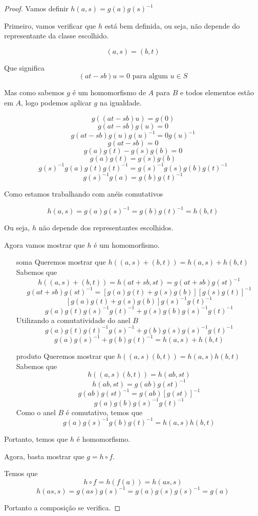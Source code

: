 \documentclass[10pt,a4paper]{article}
\begin{document}
\begin{proof}
	 Vamos definir $h(a,s)=g(a)g(s)^{-1}$
	 
	 Primeiro, vamos verificar que $h$ está bem definida, ou seja, não depende do representante da classe escolhido.
	 
	 $$(a,s)=(b,t)$$
	 
	 Que significa $$(at-sb)u=0 \text{ para algum } u \in S$$
	 
	 Mas como sabemos $g$ é um homomorfismo de $A$ para $B$ e todos elementos estão em $A$, logo podemos aplicar $g$ na igualdade.
	 
	 $$g((at-sb)u)=g(0)$$
	 $$g(at-sb)g(u)=0$$
	 $$g(at-sb)g(u)g(u)^{-1}=0g(u)^{-1}$$
	 $$g(at-sb)=0$$
	 $$g(a)g(t)-g(s)g(b)=0$$	 
	 $$g(a)g(t)=g(s)g(b)$$
	 $$g(s)^{-1}g(a)g(t)g(t)^{-1}=g(s)^{-1}g(s)g(b)g(t)^{-1}$$
	 $$g(s)^{-1}g(a)=g(b)g(t)^{-1}$$
	 
	 Como estamos trabalhando com anéis comutativos
	 
	 $$h(a,s)=g(a)g(s)^{-1}=g(b)g(t)^{-1}=h(b,t)$$
	 
	 Ou seja, $h$ não depende dos representantes escolhidos.
	 
	 Agora vamos mostrar que $h$ é um homomorfismo.
	 
	 \begin{enumerate}
	 	\item[soma] Queremos mostrar que $h((a,s)+(b,t))=h(a,s)+h(b,t)$ 
	 	Sabemos que
	 	$$h((a,s)+(b,t))=h(at+sb,st)=g(at+sb)g(st)^{-1}$$
	 	$$g(at+sb)g(st)^{-1}=[g(a)g(t)+g(s)g(b)][g(s)g(t)]^{-1}$$
	 	$$[g(a)g(t)+g(s)g(b)]g(s)^{-1}g(t)^{-1}$$
	 	$$g(a)g(t)g(s)^{-1}g(t)^{-1}+g(s)g(b)g(s)^{-1}g(t)^{-1}$$
	 	Utilizando a comutatividade do anel $B$
	 	$$g(a)g(t)g(t)^{-1}g(s)^{-1}+g(b)g(s)g(s)^{-1}g(t)^{-1}$$
	 	$$g(a)g(s)^{-1}+g(b)g(t)^{-1}=h(a,s)+h(b,t)$$
	 	\item[produto] Queremos mostrar que $h((a,s)(b,t))=h(a,s)h(b,t)$
	 	Sabemos que
	 	$$h((a,s)(b,t))=h(ab,st)$$
	 	$$h(ab,st)=g(ab)g(st)^{-1}$$
	 	$$g(ab)g(st)^{-1}=g(ab)[g(st)]^{-1}$$
	 	$$g(a)g(b)g(s)^{-1}g(t)^{-1}$$
	 	Como o anel $B$ é comutativo, temos que
	 	$$g(a)g(s)^{-1}g(b)g(t)^{-1}=h(a,s)h(b,t)$$	 	
	 \end{enumerate}
 
 	Portanto, temos que $h$ é homomorfismo.
 
 	Agora, basta mostrar que $g = h\circ f$.
 	
 	Temos que $$ h\circ f=h(f(a))=h(as,s)$$
 	$$h(as,s)=g(as)g(s)^{-1}=g(a)g(s)g(s)^{-1}=g(a)$$
 	
 	Portanto a composição se verifica.
	 
\end{proof}
\end{document}
